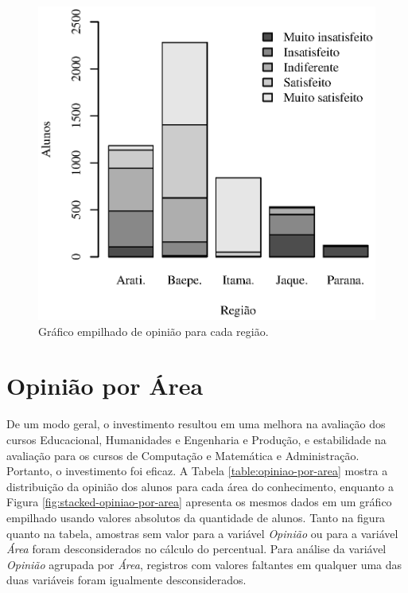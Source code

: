 \documentclass[10pt,a4paper,oneside]{article}
\newcommand{\adm}{Administração\xspace}
\newcommand{\comp}{Computação e Matemática\xspace}
\newcommand{\edu}{Educacional\xspace}
\newcommand{\eng}{Engenharia e Produção\xspace}
\newcommand{\hum}{Humanidades\xspace}
\begin{document}
\begin{figure}[!h]
	\centering
	\includegraphics[]{plots/stacked_opiniao_por_regiao.eps}
	\caption{Gráfico empilhado de opinião para cada região.}
	\label{fig:stacked-opiniao-por-regiao}
\end{figure}

\clearpage{}

\FloatBarrier
\section{Opinião por Área}
\label{section:opiniao-curso}

De um modo geral, o investimento resultou em uma melhora na avaliação dos cursos \edu, \hum e \eng, e estabilidade na avaliação para os cursos de \comp e \adm. Portanto, o investimento foi eficaz. A Tabela \ref{table:opiniao-por-area} mostra a distribuição da opinião dos alunos para cada área do conhecimento, enquanto a Figura \ref{fig:stacked-opiniao-por-area} apresenta os mesmos dados em um gráfico empilhado usando valores absolutos da quantidade de alunos. Tanto na figura quanto na tabela, amostras sem valor para a variável \textit{Opinião} ou para a variável \textit{Área} foram desconsiderados no cálculo do percentual. Para análise da variável \textit{Opinião} agrupada por \textit{Área}, registros com valores faltantes em qualquer uma das duas variáveis foram igualmente desconsiderados.
\end{document}
